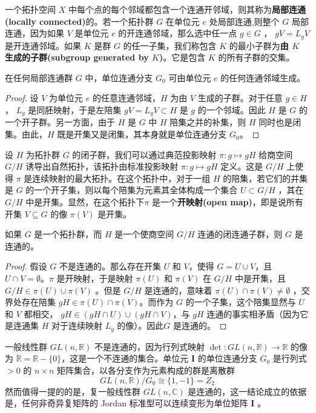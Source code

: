 一个拓扑空间 $X$ 中每个点的每个邻域都包含一个连通开邻域，则其称为\textbf{局部连通(locally connected)}的。若一个拓扑群 $G$ 在单位元 $e$ 处局部连通,则整个 $G$ 局部连通，因为如果 $V$ 是单位元 $e$ 的开连通邻域，那么选中任一点 $g\in G$ ， $gV =L_{g} V$ 是开连通邻域。如果 $K$ 是群 $G$ 的任一子集，我们称包含 $K$ 的最小子群为\textbf{由 $K$ 生成的子群(subgroup generated by $ K$)}。它是包含 $K$ 的所有子群的交集。

\begin{theorem}\label{eg:10.21}
	在任何局部连通群 $G$ 中，单位连通分支 $G_{0}$ 可由单位元 $e$ 的任何连通邻域生成。
\end{theorem}

\begin{proof}
	设 $V$ 为单位元 $e$ 的任意连通邻域，$H$ 为由 $V$ 生成的子群。对于任意 $g\in H$， $L_{g}$ 是同胚映射，于是左陪集 $gV=L_{g} V\subset H$ 是 $g$ 的一个邻域。因此 $H$ 是 $G$ 的一个开子群。另一方面，由于 $H$ 是 $G$ 中 $H$ 陪集之并的补集，则 $H$ 同时也是闭集。由此，$H$ 既是开集又是闭集，其本身就是单位连通分支 $G_{0}$。
\end{proof}

	设 $H$ 为拓扑群 $G$ 的闭子群，我们可以通过典范投影映射 $\pi :g\mapsto gH$ 给商空间 $G/H$ 诱导出自然拓扑，该拓扑由标准投影映射 $\pi :g\mapsto gH$ 定义。这是 $G/H$ 上使得 $\pi $ 是连续映射的最大拓扑。在这个拓扑中，对于一组 $H$ 的陪集，若它们的并集是 $G$ 的一个开子集，则以每个陪集为元素其全体构成一个集合 $U\subset G/H$ ，其在 $G/H$ 中是开集。显然，在这个拓扑下$\pi $ 是一个\textbf{开映射(open map)}，即是说所有开集 $V\subseteq G$ 的像 $\pi (V)$ 是开集。

\begin{theorem}\label{eg:10.22}
	如果 $G$ 是一个拓扑群，而 $H$ 是一个使商空间 $G/H$ 连通的闭连通子群，则 $G$ 是连通的。
\end{theorem}

\begin{proof}
	假设 $G$ 不是连通的。那么存在开集 $U$ 和 $V$，使得 $G=U\cup V$，且 $U\cap V=\emptyset $。$\pi $ 是开映射，于是映射 $\pi (U)$ 和 $\pi (V)$ 在 $G/H$ 中是开集，且 $G/H\in \pi (U)\cup \pi (V)$ 。但是 $G/H$ 是连通的，意味着 $\pi (U)\cap \pi (V)\neq \emptyset $ ，交界处存在陪集 $gH\in \pi (U)\cap \pi (V)$。而作为 $G$ 的一个子集，这个陪集显然与 $ U$ 和 $ V$ 都相交， $gH\in (gH\cap U)\cup (gH\cap V)$，与 $gH$ 连通的事实相矛盾（因为它是连通集 $ H$ 对于连续映射 $L_{g}$ 的像）。因此$G$ 是连通的。
\end{proof}

\begin{eg}\label{eg:10.22}
	一般线性群 $GL(n,\mathbb{R} )$ 不是连通的，因为行列式映射 $\det :GL(n,\mathbb{R} )\rightarrow \mathbb{R}$ 的像为 $\dot{\mathbb{R}} =\mathbb{R} -\{0\}$，这是一个不连通的集合。单位元 $ \mathbf{I}$ 的单位连通分支 $G_{0}$ 是行列式 $  >0$ 的 $n\times n$ 矩阵集合，以各分支作为元素构成的群是离散群
\begin{equation*}
GL(n,\mathbb{R} )/G_{0} \cong \{1,-1\}=Z_{2}
\end{equation*}
然而值得一提的的是，复一般线性群 $GL(n,\mathbb{C} )$ 是连通的，这一结论成立的依据是，任何非奇异复矩阵的 Jordan 标准型可以连续变形为单位矩阵 $ \mathbf{I}$ 。
\end{eg}

